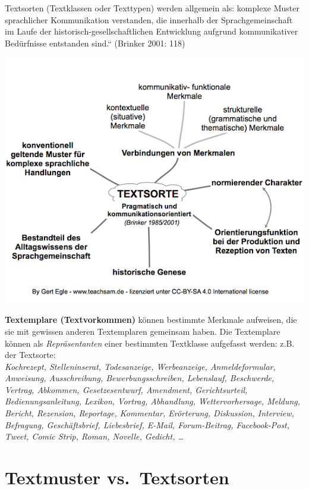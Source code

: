 \documentclass[
  letterpaper,
]{scrbook}
\begin{document}
Textsorten (Textklassen oder Texttypen) werden allgemein als: komplexe
Muster sprachlicher Kommunikation verstanden, die innerhalb der
Sprachgemeinschaft im Laufe der historisch-gesellschaftlichen
Entwicklung aufgrund kommunikativer Bedürfnisse entstanden sind.``
(Brinker 2001: 118)

\includegraphics[width=1\textwidth,height=\textheight]{./pictures/textsorte kommunikationsorientiert brinker 550px.png}

\textbf{Textemplare (Textvorkommen)} können bestimmte Merkmale
aufweisen, die sie mit gewissen anderen Textemplaren gemeinsam haben.
Die Textemplare können als \emph{Repräsentanten} einer bestimmten
Textklasse aufgefasst werden: z.B. der Textsorte:\\
\emph{Kochrezept, Stelleninserat, Todesanzeige, Werbeanzeige,
Anmeldeformular, Anweisung, Ausschreibung, Bewerbungsschreiben,
Lebenslauf, Beschwerde, Vertrag, Abkommen, Gesetzesentwurf, Amendment,
Gerichtsurteil, Bedienungsanleitung, Lexikon, Vortrag, Abhandlung,
Wettervorhersage, Meldung, Bericht, Rezension, Reportage, Kommentar,
Erörterung, Diskussion, Interview, Befragung, Geschäftsbrief,
Liebesbrief, E-Mail, Forum-Beitrag, Facebook-Post, Tweet, Comic Strip,
Roman, Novelle, Gedicht, \ldots{}}

\hypertarget{textmuster-vs.-textsorten}{%
\section{Textmuster vs.~Textsorten}\label{textmuster-vs.-textsorten}}
\end{document}
